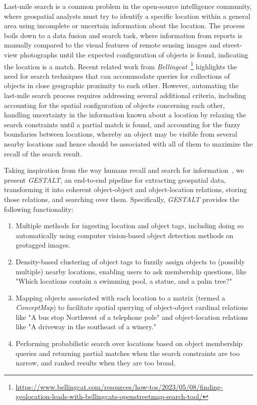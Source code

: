 Last-mile search is a common problem in the open-source intelligence community, where geospatial analysts must try to identify a specific location within a general area using incomplete or uncertain information about the location. 
The process boils down to a data fusion and search task, where information from reports is manually compared to the visual features of remote sensing images and street-view photographs until the expected configuration of objects is found, indicating the location is a match.
Recent related work from \textit{Bellingcat}~\footnote{\href{https://www.bellingcat.com/resources/how-tos/2023/05/08/finding-geolocation-leads-with-bellingcats-openstreetmap-search-tool/}{https://www.bellingcat.com/resources/how-tos/2023/05/08/finding-geolocation-leads-with-bellingcats-openstreetmap-search-tool/}} highlights the need for search techniques that can accommodate queries for collections of objects in close geographic proximity to each other.
However, automating the last-mile search process requires addressing several additional criteria, including accounting for the spatial configuration of objects concerning each other, handling uncertainty in the information known about a location by relaxing the search constraints until a partial match is found, and accounting for the fuzzy boundaries between locations, whereby an object may be visible from several nearby locations and hence should be associated with all of them to maximize the recall of the search result.

Taking inspiration from the way humans recall and search for information~\cite{Helbing2020, Oliveira2016, Weisberg2016}, we present \emph{GESTALT}, an end-to-end pipeline for extracting geospatial data, transforming it into coherent object-object and object-location relations, storing those relations, and searching over them. Specifically, \emph{GESTALT} provides the following functionality:
\begin{enumerate}
    \item Multiple methods for ingesting location and object tags, including doing so automatically using computer vision-based object detection methods on geotagged images.
    \item Density-based clustering of object tags to fuzzily assign objects to (possibly multiple) nearby locations, enabling users to ask membership questions, like "Which locations contain a swimming pool, a statue, and a palm tree?"
    \item Mapping objects associated with each location to a matrix (termed a \emph{ConceptMap}) to facilitate spatial querying of object-object cardinal relations like "A bus stop Northwest of a telephone pole" and object-location relations like "A driveway in the southeast of a winery."
    \item Performing probabilistic search over locations based on object membership queries and returning partial matches when the search constraints are too narrow, and ranked results when they are too broad.
\end{enumerate}

